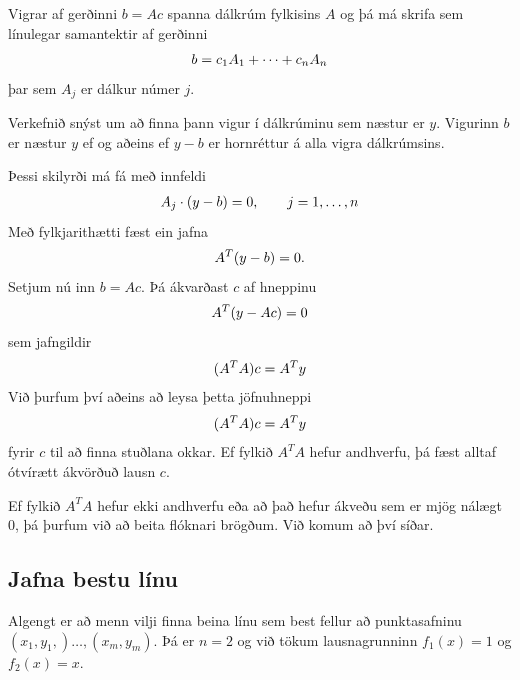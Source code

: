 \documentclass[A4paper,10pt,icelandic]{sphinxmanual}
\begin{document}
Vigrar af gerðinni \(b= Ac\) spanna dálkrúm fylkisins \(A\) og
þá má skrifa sem línulegar samantektir af gerðinni
\begin{gather}
\begin{split}b = c_1A_1 + \cdots + c_nA_n\end{split}\notag
\end{gather}
þar sem \(A_j\) er dálkur númer \(j\).

Verkefnið snýst um að finna þann vigur í dálkrúminu sem næstur er
\(y\). Vigurinn \(b\) er næstur \(y\) ef og aðeins ef
\(y-b\) er hornréttur á alla vigra dálkrúmsins.

Þessi skilyrði má fá með innfeldi
\begin{gather}
\begin{split}A_j \cdot (y-b) = 0, \qquad j = 1, \ldots , n\end{split}\notag
\end{gather}
Með fylkjarithætti fæst ein jafna
\begin{gather}
\begin{split}A^T (y-b) = 0.\end{split}\notag
\end{gather}
Setjum nú inn \(b=Ac\). Þá ákvarðast \(c\) af hneppinu
\begin{gather}
\begin{split}A^T(y-Ac) = 0\end{split}\notag
\end{gather}
sem jafngildir
\begin{gather}
\begin{split}(A^TA)c = A^Ty\end{split}\notag
\end{gather}
Við þurfum því aðeins að leysa þetta jöfnuhneppi
\begin{gather}
\begin{split}(A^TA)c = A^Ty\end{split}\notag
\end{gather}
fyrir \(c\) til að finna stuðlana okkar. Ef fylkið \(A^TA\)
hefur andhverfu, þá fæst alltaf ótvírætt ákvörðuð lausn \(c\).

Ef fylkið \(A^TA\) hefur ekki andhverfu eða að það hefur ákveðu sem
er mjög nálægt \(0\), þá þurfum við að beita flóknari brögðum. Við
komum að því síðar.


\subsection{Jafna bestu línu}
\label{kafli03:index-25}\label{kafli03:id11}
Algengt er að menn vilji finna beina línu sem best fellur að
punktasafninu \((x_1,y_1,)\dots,(x_m,y_m)\). Þá er \(n=2\) og
við tökum lausnagrunninn \(f_1(x)=1\) og \(f_2(x)=x\).
\end{document}
